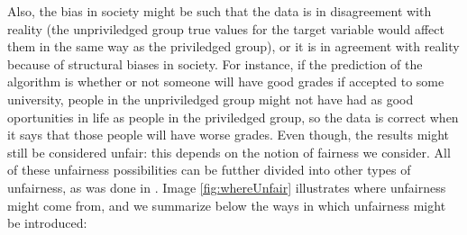 Also, the bias in society might be such that the data is in disagreement with reality (the unpriviledged group true values for the target variable would affect them in the same way as the priviledged group), or it is in agreement with reality because of structural biases in society. For instance, if the prediction of the algorithm is whether or not someone will have good grades if accepted to some university, people in the unpriviledged group might not have had as good oportunities in life as people in the priviledged group, so the data is correct when it says that those people will have worse grades. Even though, the results might still be considered unfair: this depends on the notion of fairness we consider. All of these unfairness possibilities can be futther divided into other types of unfairness, as was done in \cite{mehrabi2021survey}. Image \ref{fig:whereUnfair} illustrates where unfairness might come from, and we summarize below the ways in which unfairness might be introduced:

